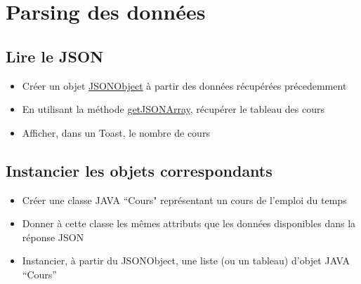 \documentclass{article}
\begin{document}
\section{Parsing des données}
\subsection{Lire le JSON}
\begin{itemize} 
  \item Créer un objet
  \href{http://developer.android.com/reference/org/json/JSONObject.html}{JSONObject}
  à partir des données récupérées précedemment
  \item En utilisant la méthode
  \href{http://developer.android.com/reference/org/json/JSONObject.html#getJSONArray(java.lang.String)}{getJSONArray},
  récupérer le tableau des cours  
  \item Afficher, dans un Toast, le nombre de cours  
\end{itemize}
\subsection{Instancier les objets correspondants}
\begin{itemize} 
  \item Créer une classe JAVA ``Cours" représentant un cours de l'emploi du
  temps
  \item Donner à cette classe les mêmes attributs que les données disponibles dans la réponse JSON
  \item Instancier, à partir du JSONObject, une liste (ou un tableau) d'objet
  JAVA ``Cours''
\end{itemize}
\end{document}
